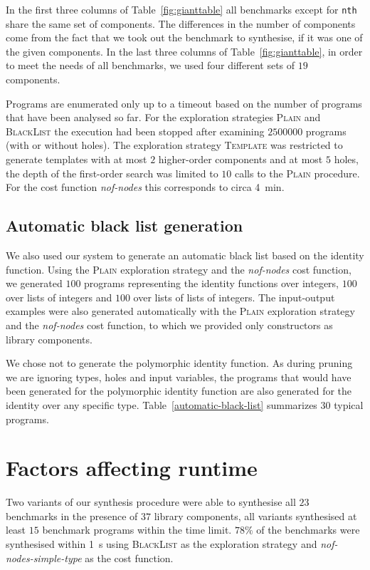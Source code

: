 In the first three columns of Table~\ref{fig:gianttable} all benchmarks except for \lstinline?nth? share the same set of components. The differences in the number of components come from the fact that we took out the benchmark to synthesise, if it was one of the given components.
In the last three columns of Table~\ref{fig:gianttable}, in order to meet the needs of all benchmarks, we used four different sets of $19$ components.

Programs are enumerated only up to a timeout based on the number of programs that have been analysed so far. For the exploration strategies \textsc{Plain} and \textsc{BlackList} the execution had been stopped after examining $2500000$ programs (with or without holes). The exploration strategy \textsc{Template} was restricted to generate templates with at most $2$ higher-order components and at most $5$ holes, the depth of the first-order search was limited to $10$ calls to the \textsc{Plain} procedure. For the cost function \textit{nof-nodes} this corresponds to circa \SI{4}{min}.


\subsection{Automatic black list generation}\label{Black list generation}
We also used our system to generate an automatic black list based on the identity function. Using the \textsc{Plain} exploration strategy and the \textit{nof-nodes} cost function, we generated $100$ programs representing the identity functions over integers, $100$ over lists of integers and $100$ over lists of lists of integers. The input-output examples were also generated automatically with the \textsc{Plain} exploration strategy and the \textit{nof-nodes} cost function, to which we provided only constructors as library components.

We chose not to generate the polymorphic identity function. As during pruning we are ignoring types, holes and input variables, the programs that would have been generated for the polymorphic identity function are also generated for the identity over any specific type.
Table~\ref{automatic-black-list} summarizes $30$ typical programs.


\section{Factors affecting runtime}\label{Factors affecting runtime}
Two variants of our synthesis procedure were able to synthesise all $23$ benchmarks in the presence of $37$ library components, all variants synthesised at least $15$ benchmark programs within the time limit. $78\%$ of the benchmarks were synthesised within \SI{1}{s} using \textsc{BlackList} as the exploration strategy and \textit{nof-nodes-simple-type} as the cost function.

